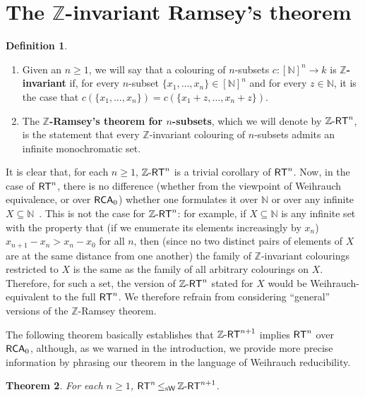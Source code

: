\documentclass[10pt,a4paper]{amsart}
\newcommand{\rt}{\mathnormal{\mathsf{RT}}}
\newcommand{\zrt}{\mathnormal{\mathbb Z\text{-}\mathsf{RT}}}
\newcommand{\rca}{\mathnormal{\mathsf{RCA}}_0}
\newcommand{\weisleq}{\mathop{\leq_{\mathrm{s}\mathsf{W}}}}
\newtheorem{theorem}{Theorem}%
\theoremstyle{definition}
\newtheorem{definition}[theorem]{Definition}
\begin{document}
\section{The $\mathbb Z$-invariant Ramsey's theorem}

\begin{definition}\hfill
\begin{enumerate}
\item Given an $n\geq 1$, we will say that a colouring of $n$-subsets $c:[\mathbb N]^n\longrightarrow k$ is {\bf $\mathbb Z$-invariant} if, for every $n$-subset $\{x_1,\ldots,x_n\}\in[\mathbb N]^n$ and for every $z\in\mathbb N$, it is the case that $c(\{x_1,\ldots,x_n\})=c(\{x_1+z,\ldots,x_n+z\})$.
\item The {\bf $\mathbb Z$-Ramsey's theorem for $n$-subsets}, which we will denote by $\zrt^n$, is the statement that every $\mathbb Z$-invariant colouring of $n$-subsets admits an infinite monochromatic set.
\end{enumerate}
\end{definition}

It is clear that, for each $n\geq 1$, $\zrt^n$ is a trivial corollary of $\rt^n$. Now, in the case of $\rt^n$, there is no difference (whether from the viewpoint of Weihrauch equivalence, or over $\rca$) whether one formulates it over $\mathbb N$ or over any infinite $X\subseteq\mathbb N$~\cite[Proposition 8.3.4]{dzhafarov-mummert-textbook}. This is not the case for $\zrt^n$: for example, if $X\subseteq\mathbb N$ is any infinite set with the property that (if we enumerate its elements increasingly by $x_n$) $x_{n+1}-x_n>x_n-x_0$ for all $n$, then (since no two distinct pairs of elements of $X$ are at the same distance from one another) the family of $\mathbb Z$-invariant colourings restricted to $X$ is the same as the family of all arbitrary colourings on $X$. Therefore, for such a set, the version of $\zrt^n$ stated for $X$ would be Weihrauch-equivalent to the full $\rt^n$. We therefore refrain from considering ``general'' versions of the $\mathbb Z$-Ramsey theorem.

The following theorem basically establishes that $\zrt^{n+1}$ implies $\rt^n$ over $\rca$, although, as we warned in the introduction, we provide more precise information by phrasing our theorem in the language of Weihrauch reducibility.

\begin{theorem}\label{thm2}
For each $n\geq 1$, $\rt^n\weisleq\zrt^{n+1}$.
\end{theorem}
\end{document}
